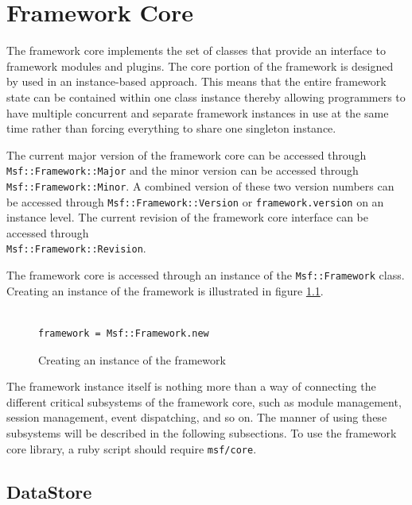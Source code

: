 \documentclass{report}
\begin{document}
\chapter{Framework Core}

\par
The framework core implements the set of classes that provide an
interface to framework modules and plugins.  The core portion of the
framework is designed by used in an instance-based approach.  This
means that the entire framework state can be contained within one
class instance thereby allowing programmers to have multiple
concurrent and separate framework instances in use at the same time
rather than forcing everything to share one singleton instance.

\par
The current major version of the framework core can be accessed
through \texttt{Msf::Framework::Major} and the minor version can be
accessed through \texttt{Msf::Framework::Minor}.  A combined version
of these two version numbers can be accessed through
\texttt{Msf::Framework::Version} or \texttt{framework.version} on an
instance level.  The current revision of the framework core
interface can be accessed through
\\\texttt{Msf::Framework::Revision}.

\par
The framework core is accessed through an instance of the
\texttt{Msf::Framework} class.  Creating an instance of the
framework is illustrated in figure \ref{fig-code-framework-create}.

\begin{figure}[h]
\begin{verbatim}

framework = Msf::Framework.new
\end{verbatim}
\caption{Creating an instance of the framework}
\label{fig-code-framework-create}
\end{figure}

\par
The framework instance itself is nothing more than a way of
connecting the different critical subsystems of the framework core,
such as module management, session management, event dispatching,
and so on.  The manner of using these subsystems will be described
in the following subsections.  To use the framework core library, a
ruby script should require \texttt{msf/core}.

    \section{DataStore}
\end{document}
